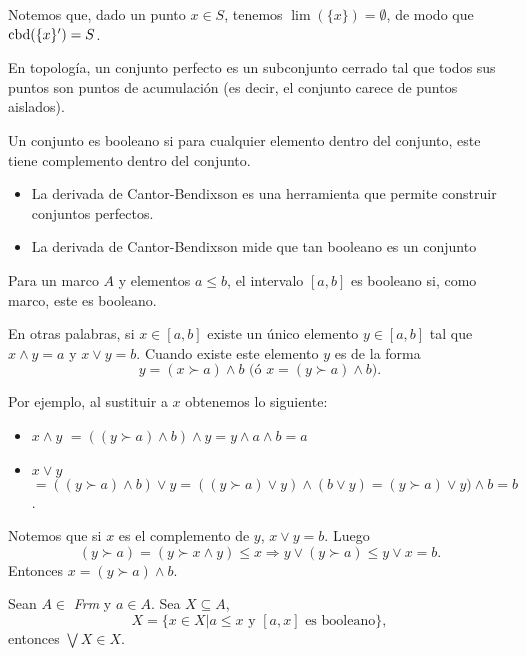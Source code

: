 Notemos que, dado un punto $x\in S$,
tenemos $\lim(\{x\})=\emptyset$,
de modo que $\operatorname{cbd}(\{x\}')=S$.

En topología, un conjunto perfecto es un subconjunto cerrado tal que todos sus puntos son puntos de acumulación (es decir, el conjunto carece de puntos aislados).

Un conjunto es booleano si para cualquier elemento dentro del conjunto, este tiene complemento dentro del conjunto.
\begin{itemize}
\item La derivada de Cantor-Bendixson es una herramienta que permite construir conjuntos perfectos.
\item La derivada de Cantor-Bendixson mide que tan booleano es un conjunto
\end{itemize}

\begin{defn}
Para un marco $A$ y elementos $a\leq b$, el intervalo $[a,b]$ es booleano si, como marco, este es booleano.
\end{defn}

\noindent
En otras palabras, si $x\in[a,b]$ existe un único elemento $y\in[a,b]$ tal que $x\wedge y=a$ y $x\vee y=b$. Cuando existe este elemento $y$ es de la forma $$y=(x\succ a)\wedge b\mbox{  (ó }x=(y\succ a)\wedge b).$$

\noindent
Por ejemplo, al sustituir a $x$ obtenemos lo siguiente:

\begin{itemize}
    \item $x\wedge y$ $=((y\succ a)\wedge b)\wedge y=y\wedge a\wedge b=a$
\item $x\vee y$ $=((y\succ a)\wedge b)\vee y=((y\succ a)\vee y)\wedge (b\vee y)=(y\succ a)\vee y)\wedge b=b$.
\end{itemize}

\noindent
Notemos que si $x$ es el complemento de $y$, $x\vee y=b$. Luego $$(y\succ a)=(y\succ x\wedge y)\leq x\Rightarrow y\vee (y\succ a)\leq y\vee x=b.$$
Entonces $x=(y\succ a)\wedge b.$

\begin{lemma}
Sean $A\in$ \textit{Frm} y $a\in A$. Sea $X\subseteq A$, $$X=\{x\in X|a\leq x\mbox{ y } [a, x]\mbox{ es booleano}\},$$ entonces $\bigvee X\in X$. 
\end{lemma}


